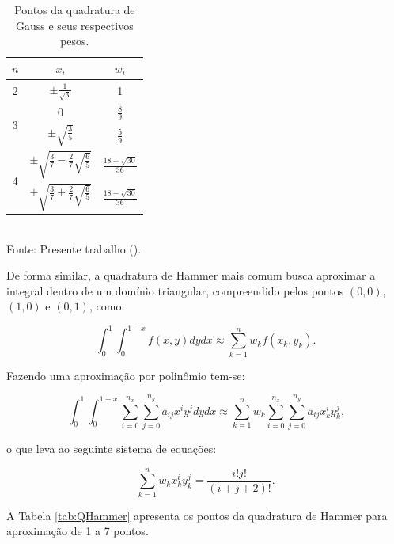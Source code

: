 \begin{table}[h!]
    \centering
    \caption{Pontos da quadratura de Gauss e seus respectivos pesos.}
    \begin{tabular}{ccc}
        \hline
        $n$                & $x_i$                                                 & $w_i$                     \\ \hline
        2                  & $\pm\frac{1}{\sqrt{3}}$                               & 1                         \\ \hline
        \multirow{2}{*}{3} & $0$                                                   & $\frac{8}{9}$             \\
                           & $\pm\sqrt{\frac{3}{5}}$                               & $\frac{5}{9}$             \\ \hline
        \multirow{2}{*}{4} & $\pm\sqrt{\frac{3}{7}-\frac{2}{7}\sqrt{\frac{6}{5}}}$ & $\frac{18+\sqrt{30}}{36}$ \\
                           & $\pm\sqrt{\frac{3}{7}+\frac{2}{7}\sqrt{\frac{6}{5}}}$ & $\frac{18-\sqrt{30}}{36}$ \\ \hline
    \end{tabular}
    \\Fonte: Presente trabalho (\the\year).
    \label{tab:QGauss}
\end{table}

De forma similar, a quadratura de Hammer mais comum busca aproximar a integral dentro de um domínio triangular, compreendido pelos pontos $(0,0)$, $(1,0)$ e $(0,1)$, como:

\begin{equation}
    \int_0^1\int_0^{1-x}{f(x,y)dydx}\approx\sum_{k=1}^n{w_kf(x_k,y_k)}\text{.}
\end{equation}

Fazendo uma aproximação por polinômio tem-se:

\begin{equation}
    \int_0^1\int_0^{1-x}{\sum_{i=0}^{n_x}{\sum_{j=0}^{n_y}{a_{ij}x^iy^j}}dydx}\approx\sum_{k=1}^n{w_k\sum_{i=0}^{n_x}{\sum_{j=0}^{n_y}{a_{ij}x_k^iy_k^j}}}\text{,}
\end{equation}

\noindent o que leva ao seguinte sistema de equações:

\begin{equation}
    \sum_{k=1}^n{w_kx_k^iy_k^j}=\frac{i!j!}{(i+j+2)!}\text{.}
\end{equation}

A Tabela \ref{tab:QHammer} apresenta os pontos da quadratura de Hammer para aproximação de 1 a 7 pontos.


